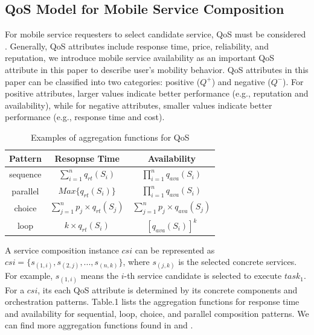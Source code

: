 \documentclass[10pt,journal,compsoc]{IEEEtran}
\begin{document}
\subsection{QoS Model for Mobile Service Composition}
For mobile service requesters to select candidate service, QoS must be considered \cite{Wu2016,luo2014efficient,luo2016generating}. Generally, QoS attributes include response time, price, reliability, and reputation, we introduce mobile service availability as an important QoS attribute in this paper to describe user's mobility behavior. QoS attributes in this paper can be classified into two categories: positive ($Q^+$) and negative ($Q^{-}$). For positive attributes, larger values indicate better performance (e.g., reputation and availability), while for negative attributes, smaller values indicate better performance (e.g., response time and cost).

\begin{table}[!t]
\renewcommand{\arraystretch}{1.3}
\caption{Examples of aggregation functions for QoS}
\label{aggregation functions}
\centering
\begin{tabular}{ccc}
\hline
\bfseries Pattern & \bfseries Resopnse Time & \bfseries Availability \\
\hline
sequence & $\sum_{i=1}^{n}q_{rt}(S_i)$ & $\prod_{i=1}^{n}q_{ava}(S_i)$ \\
parallel & $Max\{q_{rt}(S_i)\}$ & $\prod_{i=1}^{n}q_{ava}(S_i)$ \\
choice & $\sum_{j=1}^{n} p_j \times q_{rt}(S_j)$ & $\sum_{j=1}^{n} p_j \times q_{ava}(S_j)$ \\
loop & $k \times q_{rt}(S_i)$ & $[q_{ava}(S_i)]^{k}$ \\
\hline
\end{tabular}
\end{table}

A service composition instance $csi$ can be represented as $csi = \{s_{(1,i)}, s_{(2,j)},...,s_{(n,k)}\}$, where $s_{(j,k)}$ is the selected concrete services. For example, $s_{(1,i)}$ means the $i$-th service candidate is selected to execute $task_1$. For a $csi$, its each QoS attribute is determined by its concrete components and orchestration patterns. Table.1 lists the aggregation functions for response time and availability for sequential, loop, choice, and parallel composition patterns. We can find more aggregation functions found in \cite{jaeger2004qos} and \cite{zheng2013qos}.
\end{document}
